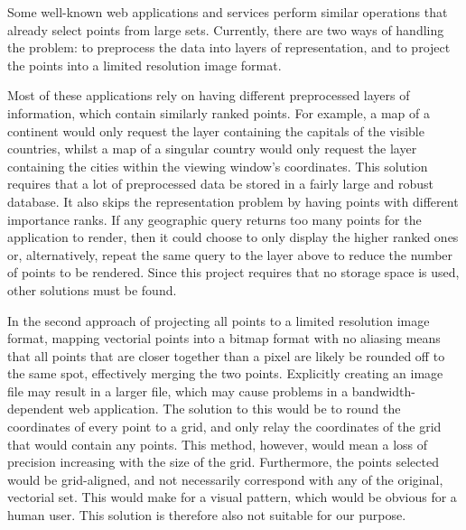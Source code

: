 

Some well-known web applications and services perform similar operations that already select points from large sets. Currently, there are two ways of handling the problem: to preprocess the data into layers of representation, and to project the points into a limited resolution image format.

Most of these applications rely on having different preprocessed layers of information, which contain similarly ranked points. For example, a map of a continent would only request the layer containing the capitals of the visible countries, whilst a map of a singular country would only request the layer containing the cities within the viewing window's coordinates. This solution requires that a lot of preprocessed data be stored in a fairly large and robust database. It also skips the representation problem by having points with different importance ranks. If any geographic query returns too many points for the application to render, then it could choose to only display the higher ranked ones or, alternatively, repeat the same query to the layer above to reduce the number of points to be rendered. Since this project requires that no storage space is used, other solutions must be found.

In the second approach of projecting all points to a limited resolution image format, mapping vectorial points into a bitmap format with no aliasing means that all points that are closer together than a pixel are likely be rounded off to the same spot, effectively merging the two points. Explicitly creating an image file may result in a larger file, which may cause problems in a bandwidth-dependent web application. The solution to this would be to round the coordinates of every point to a grid, and only relay the coordinates of the grid that would contain any points. This method, however, would mean a loss of precision increasing with the size of the grid. Furthermore, the points selected would be grid-aligned, and not necessarily correspond with any of the original, vectorial set. This would make for a visual pattern, which would be obvious for a human user. This solution is therefore also not suitable for our purpose.

